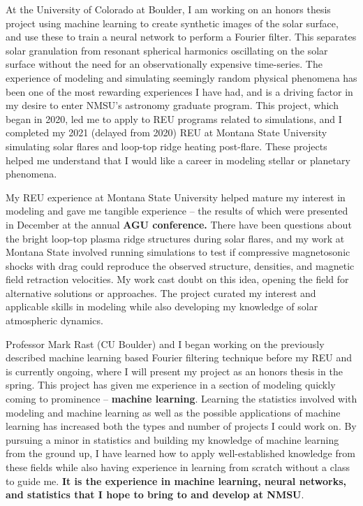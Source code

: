 \documentclass[12pt,letterpaper]{article}
\begin{document}
At the University of Colorado at Boulder, I am working on an honors thesis project using machine learning to create synthetic images of the solar surface, and use these to train a neural network to perform a Fourier filter. This separates solar granulation from resonant spherical harmonics oscillating on the solar surface without the need for an observationally expensive time-series. The experience of modeling and simulating seemingly random physical phenomena has been one of the most rewarding experiences I have had, and is a driving factor in my desire to enter NMSU's astronomy graduate program. This project, which began in 2020, led me to apply to REU programs related to simulations, and I completed my 2021 (delayed from 2020) REU at Montana State University simulating solar flares and loop-top ridge heating post-flare. These projects helped me understand that I would like a career in modeling stellar or planetary phenomena. 
 
My REU experience at Montana State University helped mature my interest in modeling and gave me tangible experience – the results of which were presented in December at the annual \textbf{AGU conference.} There have been questions about the bright loop-top plasma ridge structures during solar flares, and my work at Montana State involved running simulations to test if compressive magnetosonic shocks with drag could reproduce the observed structure, densities, and magnetic field retraction velocities. My work cast doubt on this idea, opening the field for alternative solutions or approaches. The project curated my interest and applicable skills in modeling while also developing my knowledge of solar atmospheric dynamics. 

Professor Mark Rast (CU Boulder) and I began working on the previously described machine learning based Fourier filtering technique before my REU and is currently ongoing, where I will present my project as an honors thesis in the spring. This project has given me experience in a section of modeling quickly coming to prominence -- \textbf{machine learning}. Learning the statistics involved with modeling and machine learning as well as the possible applications of machine learning has increased both the types and number of projects I could work on. By pursuing a minor in statistics and building my knowledge of machine learning from the ground up, I have learned how to apply well-established knowledge from these fields while also having experience in learning from scratch without a class to guide me. \textbf{It is the experience in machine learning, neural networks, and statistics that I hope to bring to and develop at NMSU}.
\end{document}
